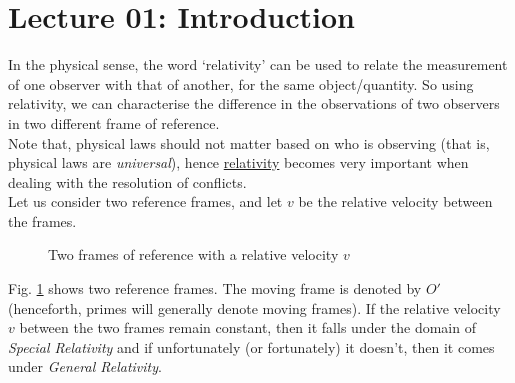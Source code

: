 \section*{Lecture 01: Introduction}

In the physical sense, the word `relativity' can be used to relate the measurement of one observer with that of another, for the same object/quantity. So using relativity, we can characterise the difference in the observations of two observers in two different frame of reference. \\[0.2cm]
Note that, physical laws should not matter based on who is observing (that is, physical laws are \textit{universal}), hence \underline{relativity} becomes very important when dealing with the resolution of conflicts.\\[0.2cm]
Let us consider two reference frames, and let $v$ be the relative velocity between the frames. 
\begin{figure}[H]
    \centering
    
    \caption{Two frames of reference with a relative velocity $v$}
    \label{fig:frame}
\end{figure}
\noindent
Fig. \ref{fig:frame} shows two reference frames. The moving frame is denoted by $O'$ (henceforth, primes will generally denote moving frames). If the relative velocity $v$ between the two frames remain constant, then it falls under the domain of \textit{Special Relativity} and if unfortunately (or fortunately) it doesn't, then it comes under \textit{General Relativity}. \\[0.2cm]

